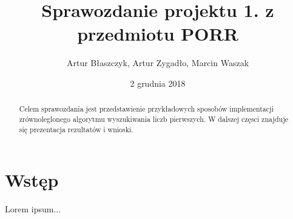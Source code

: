 \documentclass[12pt, twoside, hidelinks, a4paper]{article}
\begin{document}

\author{Artur Błaszczyk, Artur Zygadło, Marcin Waszak}
\title{Sprawozdanie projektu 1. z przedmiotu PORR}
\date{2 grudnia 2018}


\maketitle

\begin{abstract}
Celem sprawozdania jest przedstawienie przykładowych sposobów implementacji zrównoleglonego algorytmu wyszukiwania liczb pierwszych. W dalszej częsci znajduje się prezentacja rezultatów i wnioski. 
\end{abstract}

\section{Wstęp}
Lorem ipsum...

\printbibliography
\end{document}
